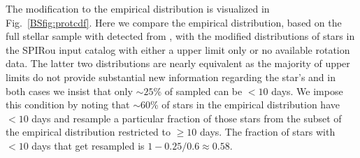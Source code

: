 The modification to the empirical \prot{} distribution is visualized in Fig.~\ref{BSfig:protcdf}.
Here we compare the empirical \prot{} distribution, based on the full stellar sample with detected
\prot{} from \cite{newton16a}, with the modified distributions of stars in the SPIRou input catalog
with either a \vsini{}
upper limit only or no available rotation data. The latter two distributions are nearly equivalent as
the majority of \vsini{} upper limits do not provide substantial new information regarding the star's \prot{}
and in both cases we insist that only $\sim 25$\% of sampled \prot{} can be $< 10$ days. We impose this
condition by noting that $\sim 60$\% of stars in the empirical distribution have \prot{} $<10$ days
and resample a particular fraction of those stars from the subset of the empirical distribution restricted
to \prot{} $\geq 10$ days. The fraction of stars with \prot{} $<10$ days that get resampled is
$1-0.25/0.6 \approx 0.58$. 

